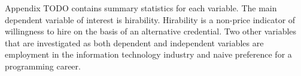\documentclass[review]{elsarticle}
\begin{document}
Appendix TODO contains summary statistics for each variable.
The main dependent variable of interest is hirability.
Hirability is a non-price indicator of willingness to hire on the basis of an alternative credential.
Two other variables that are investigated as both dependent and independent variables are
employment in the information technology industry
and naive preference for a programming career.




\end{document}
